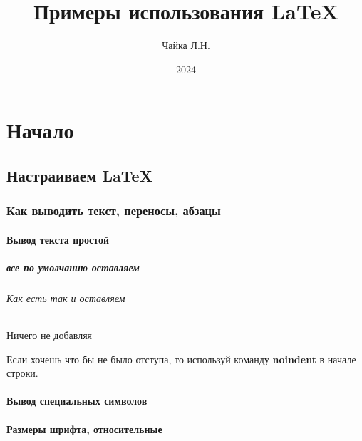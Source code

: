 \documentclass[a4paper,14pt]{book}
\title{Примеры использования \LaTeX}
\author{Чайка Л.Н.}
\date{2024}
\begin{document}
\layout

\maketitle %

\part{Начало}

\chapter{Настраиваем \LaTeX}

\section{Как выводить текст, переносы, абзацы}

\subsection{Вывод текста простой}

\subsubsection{все по умолчанию оставляем}

\paragraph{Как есть так и оставляем}

\subparagraph{Ничего не добавляя}
Если хочешь что бы не было отступа, то используй команду
\textbf{noindent} в начале строки.\newline

\subsection{Вывод специальных символов}



\subsection{Размеры шрифта, относительные}


\end{document}
